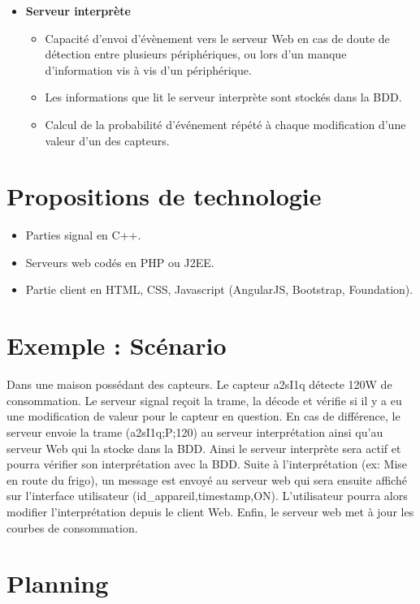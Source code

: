 \documentclass[10pt,a4paper]{article}
\begin{document}
\begin{itemize}
\item \textbf{Serveur interprète}
\begin{itemize}
  \item Capacité d'envoi d'évènement vers le serveur Web en cas de doute de détection entre plusieurs périphériques, ou lors d'un manque d'information vis à vis d'un périphérique.
  \item Les informations que lit le serveur interprète sont stockés dans la BDD.
  \item Calcul de la probabilité d'événement répété à chaque modification d'une valeur d'un des capteurs.
\end{itemize}
\end{itemize}

\section{Propositions de technologie}
\begin{itemize}
\item Parties signal en C++.
\item Serveurs web codés en PHP ou J2EE.
\item Partie client en HTML, CSS, Javascript (AngularJS, Bootstrap, Foundation).
\end{itemize}

\section{Exemple : Scénario}
Dans une maison possédant des capteurs. Le capteur a2sI1q détecte 120W de consommation.
Le serveur signal reçoit la trame, la décode et vérifie si il y a eu une modification de valeur pour le capteur en question. En cas de différence, le serveur envoie la trame (a2sI1q;P;120) au serveur interprétation ainsi qu'au serveur Web qui la stocke dans la BDD.
Ainsi le serveur interprète sera actif et pourra vérifier son interprétation avec la BDD.
Suite à l'interprétation (ex: Mise en route du frigo), un message est envoyé au serveur web qui sera ensuite affiché sur l'interface utilisateur (id\_appareil,timestamp,ON). L'utilisateur pourra alors modifier l'interprétation depuis le client Web.
Enfin, le serveur web met à jour les courbes de consommation.






\section{Planning}
\end{document}
